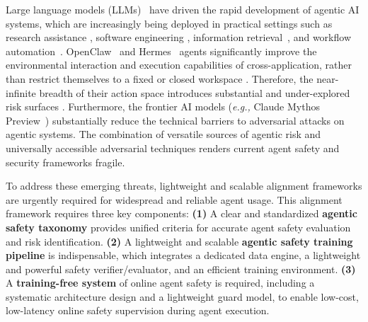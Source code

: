 \documentclass{llmxive}
\providecommand{\nosep}{\vspace{-4mm}}
\providecommand{\cmark}{{\ding{51}}}
\providecommand{\xmark}{{\ding{55}}}
\providecommand{\yes}{{\ding{51}}}
\providecommand{\no}{{\ding{55}}}
\begin{document}
\renewcommand{\nosep}{\vspace{-4mm}}


\renewcommand{\cmark}{{}}
\renewcommand{\xmark}{{}}

\renewcommand{\yes}{{}}
\renewcommand{\no}{{}}


Large language models (LLMs)~\citep{openai_gpt54_2026, anthropic_claude_opus_46_2026, glm5team2026glm5, gemini3} have driven the rapid development of agentic AI systems, which are increasingly being deployed in practical settings such as research assistance \citep{zheng2025deepresearcher}, software engineering \citep{jimenez2023swe}, information retrieval~\citep{zhao2025tura}, and workflow automation~\citep{wang2024agentworkflowmemory}. OpenClaw~\citep{steinberger2026openclaw} and Hermes~\citep{nousresearch2026hermes} agents significantly improve the environmental interaction and execution capabilities of cross-application, rather than restrict themselves to a fixed or closed workspace \citep{verge_moltbot_2026, wired_moltbot_2026}. Therefore, the near-infinite breadth of their action space introduces substantial and under-explored risk surfaces \citep{kim2026attack, wang2025comprehensive}. Furthermore, the frontier AI models (\emph{e.g., }Claude Mythos Preview~\citep{Mythos_Preview}) substantially reduce the technical barriers to adversarial attacks on agentic systems. The combination of versatile sources of agentic risk and universally accessible adversarial techniques renders current agent safety and security frameworks fragile.


 To address these emerging threats, lightweight and scalable alignment frameworks are urgently required for widespread and reliable agent usage. This alignment framework requires three key components: \textbf{(1)} A clear and standardized \textbf{agentic safety taxonomy} provides unified criteria for accurate agent safety evaluation and risk identification. \textbf{(2)} A lightweight and scalable \textbf{agentic safety training pipeline} is indispensable, which integrates a dedicated data engine, a lightweight and powerful safety verifier/evaluator, and an efficient training environment. \textbf{(3)} A \textbf{training-free system} of online agent safety is required, including a systematic architecture design and a lightweight guard model, to enable low-cost, low-latency online safety supervision during agent execution. 
 
\end{document}
